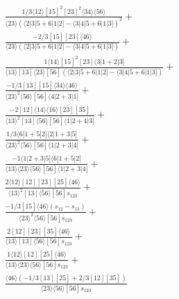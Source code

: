 \documentclass[varwidth, border=5pt]{standalone}
\begin{document}
\begin{my}
$\begin{gathered}
\scriptscriptstyle\frac{1/3⟨12⟩[15]^2[23]^2⟨34⟩⟨56⟩}{⟨23⟩(⟨2|3|5+6|1|2]-⟨3|4|5+6|1|3])^2}+\\
\scriptscriptstyle\frac{-2/3[15][23]⟨46⟩}{⟨23⟩(⟨2|3|5+6|1|2]-⟨3|4|5+6|1|3])}+\\
\scriptscriptstyle\frac{1⟨14⟩[15]^2[23]⟨3|1+2|3]}{⟨13⟩[13]⟨23⟩[56](⟨2|3|5+6|1|2]-⟨3|4|5+6|1|3])}+\\
\scriptscriptstyle\frac{-1/3[13][15]⟨34⟩⟨46⟩}{⟨23⟩^2⟨56⟩[56]⟨4|2+3|1]}+\\
\scriptscriptstyle\frac{-2[12]⟨14⟩⟨16⟩[23][35]}{⟨13⟩^2[13]⟨56⟩[56]⟨1|2+4|3]}+\\
\scriptscriptstyle\frac{1/3⟨6|1+5|2]⟨2|1+3|5]}{⟨23⟩^2⟨56⟩[56]⟨1|2+3|4]}+\\
\scriptscriptstyle\frac{-1⟨1|2+3|5]⟨6|1+5|2]}{⟨13⟩⟨23⟩⟨56⟩[56]⟨1|2+3|4]}+\\
\scriptscriptstyle\frac{2⟨12⟩[12][23][25]⟨46⟩}{⟨13⟩^2[13]⟨56⟩[56]s_{123}}+\\
\scriptscriptstyle\frac{-1/3[15]⟨46⟩(s_{12}-s_{13})}{⟨23⟩^2⟨56⟩[56]s_{123}}+\\
\scriptscriptstyle\frac{2[12][23][35]⟨46⟩}{⟨13⟩[13]⟨56⟩[56]s_{123}}+\\
\scriptscriptstyle\frac{1⟨12⟩[12][25]⟨46⟩}{⟨13⟩⟨23⟩⟨56⟩[56]s_{123}}+\\
\scriptscriptstyle\frac{⟨46⟩(-1/3[13][25]+2/3[12][35])}{⟨23⟩⟨56⟩[56]s_{123}}\phantom{+}
\end{gathered}$
\end{my}
\end{document}
